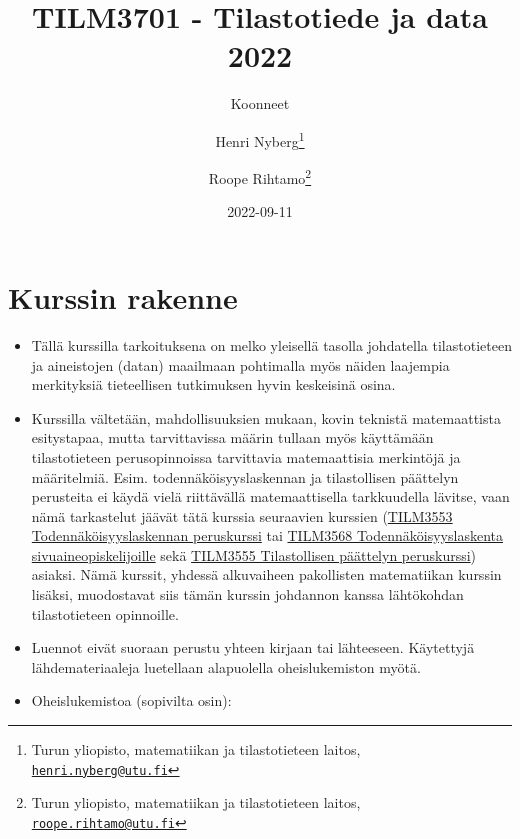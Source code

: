 \documentclass[
]{book}
\title{TILM3701 - Tilastotiede ja data 2022}
\author{Koonneet \and Henri Nyberg\footnote{Turun yliopisto, matematiikan ja tilastotieteen laitos, \href{mailto:henri.nyberg@utu.fi}{\nolinkurl{henri.nyberg@utu.fi}}} \and Roope Rihtamo\footnote{Turun yliopisto, matematiikan ja tilastotieteen laitos, \href{mailto:roope.rihtamo@utu.fi}{\nolinkurl{roope.rihtamo@utu.fi}}}}
\date{2022-09-11}
\begin{document}
\maketitle

{
\hypersetup{linkcolor=}
\setcounter{tocdepth}{1}
\tableofcontents
}
\hypertarget{kurssin-rakenne}{%
\chapter*{Kurssin rakenne}\label{kurssin-rakenne}}

\begin{itemize}
\item
  Tällä kurssilla tarkoituksena on melko yleisellä tasolla johdatella tilastotieteen ja aineistojen (datan) maailmaan pohtimalla myös näiden laajempia merkityksiä tieteellisen tutkimuksen hyvin keskeisinä osina.
\item
  Kurssilla vältetään, mahdollisuuksien mukaan, kovin teknistä matemaattista esitystapaa, mutta tarvittavissa määrin tullaan myös käyttämään tilastotieteen perusopinnoissa tarvittavia matemaattisia merkintöjä ja määritelmiä. Esim. todennäköisyyslaskennan ja tilastollisen päättelyn perusteita ei käydä vielä riittävällä matemaattisella tarkkuudella lävitse, vaan nämä tarkastelut jäävät tätä kurssia seuraavien kurssien (\href{https://opas.peppi.utu.fi/fi/opintojakso/TILM3553/1734?period=2022-2024}{TILM3553 Todennäköisyyslaskennan peruskurssi} tai \href{https://opas.peppi.utu.fi/fi/opintojakso/TILM3568/3385?period=2022-2024}{TILM3568 Todennäköisyyslaskenta sivuaineopiskelijoille} sekä \href{https://opas.peppi.utu.fi/fi/opintojakso/TILM3555/1731?period=2022-2024}{TILM3555 Tilastollisen päättelyn peruskurssi}) asiaksi. Nämä kurssit, yhdessä alkuvaiheen pakollisten matematiikan kurssin lisäksi, muodostavat siis tämän kurssin johdannon kanssa lähtökohdan tilastotieteen opinnoille.
\item
  Luennot eivät suoraan perustu yhteen kirjaan tai lähteeseen. Käytettyjä lähdemateriaaleja luetellaan alapuolella oheislukemiston myötä.
\item
  Oheislukemistoa (sopivilta osin):


\end{itemize}
\end{document}
